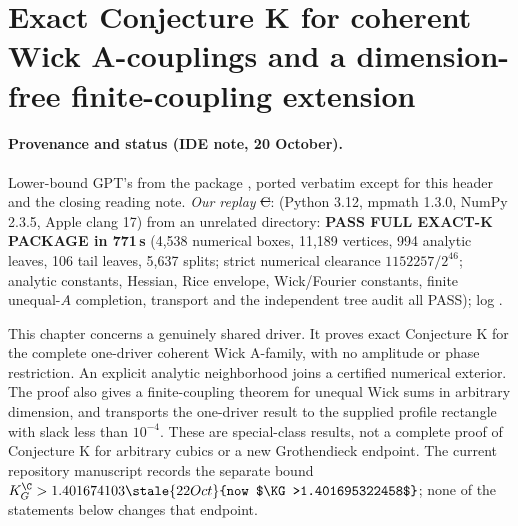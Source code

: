 \section{Exact Conjecture K for coherent Wick A-couplings and a dimension-free finite-coupling extension}
\label{ch:coherent-wick-a}

\paragraph{Provenance and status (IDE note, 20 October).} Lower-bound GPT's  from the package
, ported verbatim except for this header and the closing reading note. \emph{Our replay} \st{C}:
 (Python 3.12, mpmath 1.3.0, NumPy 2.3.5, Apple clang 17) from an unrelated directory: \textbf{PASS FULL EXACT-K PACKAGE in 771\,s}
(4{,}538 numerical boxes, 11{,}189 vertices, 994 analytic leaves, 106 tail leaves, 5{,}637 splits; strict numerical clearance $1152257/2^{46}$; analytic constants, Hessian, Rice envelope,
Wick/Fourier constants, finite unequal-$A$ completion, transport and the independent tree audit all PASS); log .


This chapter concerns a genuinely shared driver. It proves exact
Conjecture K for the complete one-driver coherent Wick A-family,
with no amplitude or phase restriction. An explicit analytic neighborhood
joins a certified numerical exterior. The proof also gives a finite-coupling
theorem for unequal Wick sums in arbitrary dimension, and transports the
one-driver result to the supplied profile rectangle with slack less than
$10^{-4}$. These are special-class results, not a complete proof of
Conjecture K for arbitrary cubics or a new Grothendieck
endpoint. The current repository manuscript records the separate bound
$K_G^{\C}>1.401674103\stale{22 Oct}{now $\KG>1.401695322458$}$; none of the statements below changes that endpoint.

